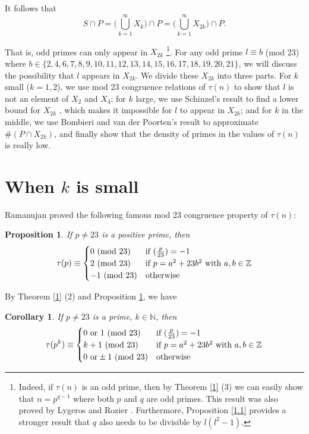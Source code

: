 \documentclass[12pt]{amsart}
\newtheorem{cor}[thm]{Corollary}
\newtheorem{prop}[thm]{Proposition}
\numberwithin{equation}{section}
\begin{document}
It follows that 
$$S\cap P=\bigg(\bigcup_{k=1}^\infty X_k\bigg)\cap P=\bigg(\bigcup_{k=1}^\infty X_{2k}\bigg)\cap P.$$

That is, odd primes can only appear in $X_{2k}$ \footnote{Indeed, if $\tau(n)$ is an odd prime, then by Theorem \ref{1} (3) we can easily show that $n=p^{q-1}$ where both $p$ and $q$ are odd primes. This result was also proved by Lygeros and Rozier \cite{LR}. Furthermore, Proposition \ref{1.1} \cite{BCOT} provides a stronger result that $q$ also needs to be divisible by $l(l^2-1)$.}. For any odd prime $l\equiv b$ (mod 23) where $b \in \{2,4,6,7,8,9,10,11,12,13,14,15,16,17,18,19,20,21\}$, we will discuss the possibility that $l$ appears in $X_{2k}$. We divide these $X_{2k}$ into three parts. For $k$ small ($k=1,2$), we use mod 23 congruence relations of $\tau(n)$ to show that $l$ is not an element of $X_2$ and $X_4$; for $k$ large, we use Schinzel's result  \cite{Schinzel} to find a lower bound for $X_{2k}$ , which makes it impossible for $l$ to appear in $X_{2k}$; and for $k$ in the middle, we use Bombieri and van der Poorten's result \cite{Bombieri} to approximate $\#(P\cap X_{2k})$, and finally show that the density of primes in the values of $\tau(n)$ is really low.\\
\section{When $k$ is small}
Ramanujan \cite{Ramanujan1916} \cite{Ramanujan} \cite{BerndtOno1999} proved the following famous mod 23 congruence property of $\tau(n)$:
\begin{prop}\label{23}
If $p\neq 23$ is a positive prime, then \begin{equation}
    \tau(p)\equiv
    \begin{cases}
      0 \textup{ (mod 23)}  & \textup{if } (\frac{p}{23})=-1 \\
      2 \textup{ (mod 23)}& \textup{if } p=a^2+23b^2 \textup{ with }a,b\in\mathbb{Z}\\
      -1 \textup{ (mod 23)}& \textup{otherwise} 
    \end{cases}
\end{equation}
\end{prop}
By Theorem \ref{1} (2) and Proposition \ref{23}, we have 
\begin{cor}\label{C}
    If $p\neq 23$ is a prime, $k\in\mathbb{N}$, then 
    \begin{equation}
        \tau(p^k)\equiv
        \begin{cases}
            0 \textup{ or }1\textup{ (mod 23)}& \textup{if }(\frac{p}{23})=-1 \\
            k+1 \textup{ (mod 23)}& \textup{if } p=a^2+23b^2 \textup{ with }a, b\in\mathbb{Z}\\
            0\textup{ or} \pm 1 \textup{ (mod 23)}& \textup{otherwise }
        \end{cases}
    \end{equation}
\end{cor}
\end{document}
